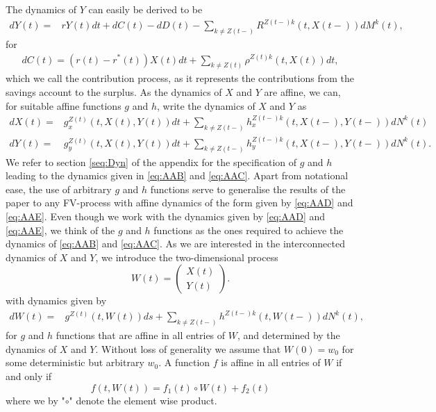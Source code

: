 \documentclass[12pt]{article}
\newcommand{\noin}{\noindent}
\theoremstyle{my_thm}
\begin{document}
\noin The dynamics of $Y$ can easily be derived to be
\begin{align}
dY(t)=&rY(t) dt + dC(t)-dD(t)-
\sum_{k \neq Z(t-)}  R^{Z(t-)k}(t,X(t-)) dM^k(t), \label{eq:AAC}
\end{align}
for 
\begin{gather*}
dC(t)=(r(t)-r^*(t))X(t)dt+\sum_{k\neq Z(t)} \rho^{Z(t)k}(t,X(t)) dt,
\end{gather*}
which we call the contribution process, as it represents the contributions from the savings account to the surplus. As the dynamics of $X$ and $Y$ are affine, we can, for suitable affine functions $g$ and $h$, write the dynamics of $X$ and $Y$ as
\begin{align}
dX(t)=&g^{Z(t)}_{x}(t,X(t),Y(t))dt + \sum_{k \neq Z(t-)}  h^{Z(t-)k}_{x}(t,X(t-),Y(t-)) dN^k(t)
\label{eq:AAD}
\\
dY(t)=&g^{Z(t)}_{y}(t,X(t),Y(t))dt + \sum_{k \neq Z(t-)} h^{Z(t-)k}_{y}(t,X(t-), Y(t-)) dN^k(t)
\label{eq:AAE}.
\end{align}
We refer to section \ref{seq:Dyn} of the appendix for the specification of $g$ and $h$ leading to the dynamics given in \eqref{eq:AAB} and \eqref{eq:AAC}. Apart from notational ease, the use of arbitrary $g$ and $h$ functions serve to generalise the results of the paper to any FV-process with affine dynamics of the form given by \eqref{eq:AAD} and \eqref{eq:AAE}. Even though we work with the dynamics given by \eqref{eq:AAD} and \eqref{eq:AAE}, we think of the $g$ and $h$ functions as the ones required to achieve the dynamics of \eqref{eq:AAB} and \eqref{eq:AAC}. As we are interested in the interconnected dynamics of $X$ and $Y$, we introduce the two-dimensional process 
$$
W(t)= \begin{pmatrix}
X(t)\\
Y(t)
\end{pmatrix}.
$$
with dynamics given by
\begin{align*}
dW(t)=& g^{Z(t)}(t,W(t)) ds+ \sum_{k\neq Z(t-)} h^{Z(t-)k}(t,W(t-)) dN^k(t),
\end{align*}
for $g$ and $h$ functions that are affine in all entries of $W$, and determined by the dynamics of $X$ and $Y$. Without loss of generality we assume that $W(0)=w_0$ for some deterministic but arbitrary $w_0$. A function $f$ is affine in all entries of $W$ if and only if
$$
f(t,W(t))=f_1(t) \circ W(t) + f_2(t)
$$
where we by "$\circ$" denote the element wise product.
\end{document}
